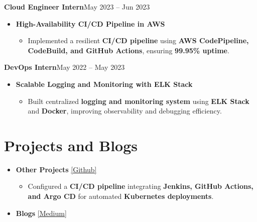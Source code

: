 \documentclass[a4paper,10.999999pt]{article}
\newenvironment{joblong}[2]
        {
        \noindent\textbf{#1}\hfill{#2}\par
        \vspace{0.3pt}
        \begin{minipage}[t]{\linewidth}
        \begin{itemize}[after=\strut, topsep=0.3pt, partopsep=0pt, parsep=0pt, leftmargin=0.5em, itemsep=0.35pt, label=\raisebox{0.2ex}{\tiny$\circ$}]
        }
        {
        \end{itemize}
        \end{minipage}
        \vspace{0.5pt}
        }
\begin{document}
    \begin{joblong}{Cloud Engineer Intern}{May 2023 -- Jun 2023}
    Mactores Innovation
    \item \textbf{High-Availability CI/CD Pipeline in AWS}
    \begin{itemize}[nosep, leftmargin=1.5em, itemsep=0.3pt, topsep=0pt, label=\raisebox{0.25ex}{\small$-$}]
    \item Implemented a resilient \textbf{CI/CD pipeline} using \textbf{AWS CodePipeline, CodeBuild, and GitHub Actions}, ensuring \textbf{99.95\% uptime}.
    \end{itemize}
    \end{joblong}
    
    \begin{joblong}{DevOps Intern}{May 2022 -- May 2023}
    Motorola Solutions
    \item \textbf{Scalable Logging and Monitoring with ELK Stack}
    \begin{itemize}[nosep, leftmargin=1.5em, itemsep=0.3pt, topsep=0pt, label=\raisebox{0.25ex}{\small$-$}]
    \item Built centralized \textbf{logging and monitoring system} using \textbf{ELK Stack} and \textbf{Docker}, improving observability and debugging efficiency.
    \end{itemize}
    \end{joblong}
    
    
    \section{Projects and Blogs}
    
    \begin{itemize}[leftmargin=1.35em, itemsep=0.35pt, topsep=0.3pt, parsep=0pt, label=\raisebox{0.25ex}{\tiny$\circ$}]
    \item \textbf{Other Projects} \href{https://github.com/KelviManavadaria-17}{[Github]}
    \begin{itemize}[nosep, leftmargin=1.5em, itemsep=0.3pt, topsep=0pt, label=\raisebox{0.25ex}{\small$-$}]
    \item Configured a \textbf{CI/CD pipeline} integrating \textbf{Jenkins, GitHub Actions, and Argo CD} for automated \textbf{Kubernetes deployments}.
    \end{itemize}
    \item \textbf{Blogs} \href{https://medium.com/@KelviManavadaria}{[Medium]}
    \end{itemize}
    
\end{document}
